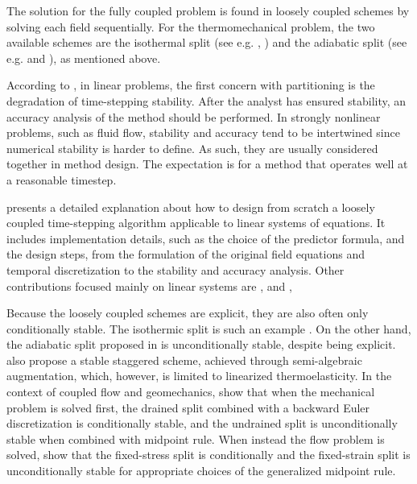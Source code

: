 The solution for the fully coupled problem is found in loosely coupled schemes by solving each field sequentially.
For the thermomechanical problem, the two available schemes are the isothermal split (see e.g. \cite{simo_recent_1992}, \cite{agelet_de_saracibar_numerical_1998}) and the adiabatic split (see e.g. \cite{armero_new_1992} and \cite{armero_priori_1993}), as mentioned above.

According to \cite{felippa_partitioned_2001}, in linear problems, the first concern with partitioning is the degradation of time-stepping stability.
After the analyst has ensured stability, an accuracy analysis of the method should be performed.
In strongly nonlinear problems, such as fluid flow, stability and accuracy tend to be intertwined since numerical stability is harder to define.
As such, they are usually considered together in method design.
The expectation is for a method that operates well at a reasonable timestep.

\cite{felippa_partitioned_1988} presents a detailed explanation about how to design from scratch a loosely coupled time-stepping algorithm applicable to linear systems of equations.
It includes implementation details, such as the choice of the predictor formula, and the design steps, from the formulation of the original field equations and temporal discretization to the stability and accuracy analysis.
Other contributions focused mainly on linear systems are \cite{neishlos_finite-element_1983}, \cite{zienkiewicz_unconditionally_1988} and \cite{combescure_numerical_2002},

Because the loosely coupled schemes are explicit, they are also often only conditionally stable.
The isothermic split is such an example \citep{armero_new_1992}.
On the other hand, the adiabatic split proposed in \cite{armero_new_1992} is unconditionally stable, despite being explicit.
\cite{farhat_unconditionally_1991} also propose a stable staggered scheme, achieved through semi-algebraic augmentation, which, however, is limited to linearized thermoelasticity.
In the context of coupled flow and geomechanics, \cite{kim_stability_2011-2} show that when the mechanical problem is solved first, the drained split combined with a backward Euler discretization is conditionally stable, and the undrained split is unconditionally stable when combined with midpoint rule.
When instead the flow problem is solved, \cite{kim_stability_2011-1} show that the fixed-stress split is conditionally and the fixed-strain split is unconditionally stable for appropriate choices of the generalized midpoint rule.

